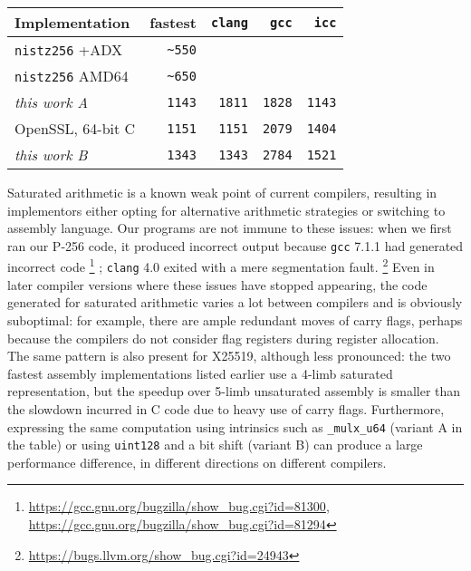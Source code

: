\documentclass[letterpaper,twocolumn,10pt]{article}
\begin{document}
\begin{center}\begin{tabular}[]{lrrrr}
  Implementation        & fastest       & \texttt{clang}& \texttt{gcc}& \texttt{icc} \\
\hline
  \texttt{nistz256} +ADX &  \verb|~550|  &  &  &  \\
  \texttt{nistz256} AMD64&  \verb|~650|  &  &  &  \\
  \textit{this work A}   &  \verb|1143|  & \texttt{1811}& \texttt{1828}& \texttt{1143}\\
  OpenSSL, 64-bit C      &  \verb|1151|  & \texttt{1151}& \texttt{2079}& \texttt{1404}\\
  \textit{this work B}   &  \verb|1343|  & \texttt{1343}& \texttt{2784}& \texttt{1521}\\
\hline
\end{tabular}\end{center}

Saturated arithmetic is a known weak point of current compilers, resulting in implementors either opting for alternative arithmetic strategies or switching to assembly language.
Our programs are not immune to these issues: when we first ran our P-256 code, it produced incorrect output because \texttt{gcc} 7.1.1 had generated incorrect code%
\footnote{\url{https://gcc.gnu.org/bugzilla/show_bug.cgi?id=81300}, \url{https://gcc.gnu.org/bugzilla/show_bug.cgi?id=81294}}%
; \texttt{clang} 4.0 exited with a mere segmentation fault.%
\footnote{\url{https://bugs.llvm.org/show_bug.cgi?id=24943}}
Even in later compiler versions where these issues have stopped appearing, the code generated for saturated arithmetic varies a lot between compilers and is obviously suboptimal:
for example, there are ample redundant moves of carry flags, perhaps because the compilers do not consider flag registers during register allocation.
The same pattern is also present for X25519, although less pronounced: the two fastest assembly implementations listed earlier use a 4-limb saturated representation, but the speedup over 5-limb unsaturated assembly is smaller than the slowdown incurred in C code due to heavy use of carry flags.
Furthermore, expressing the same computation using intrinsics such as \verb|_mulx_u64| (variant A in the table) or using \texttt{uint128} and a bit shift (variant B) can produce a large performance difference, in different directions on different compilers.
\end{document}
